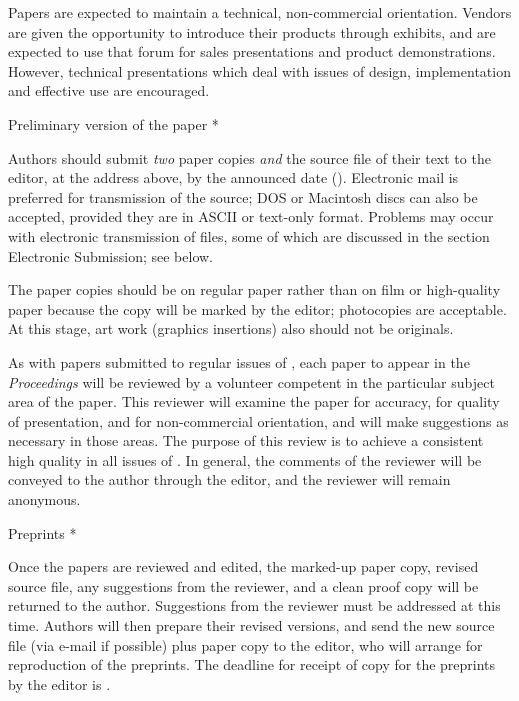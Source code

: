 Papers are expected to maintain a technical, non-commercial orientation.
Vendors are given the opportunity to introduce their products through
exhibits, and are expected to use that forum for sales presentations and
product demonstrations.  However, technical presentations which deal
with issues of design, implementation and effective use are encouraged.
 
\figure[\bot]
\endfigure
 
\subhead * Preliminary version of the paper *
 
Authors should submit {\it two\/} paper copies {\it and\/} the source
file of their text to the editor, at the address above, by the announced
date ({\bf \PrelimDeadline}). Electronic mail is preferred for
transmission of the source; {\SMC DOS} or Macintosh discs can also be
accepted, provided they are in {\SMC ASCII} or text-only format.
Problems may occur with electronic transmission of files, some of which
are discussed in the section Electronic Submission; see below.
 
The paper copies should be on regular paper rather than on
film or high-quality paper because the copy will be marked by the
editor; photocopies are acceptable.  At this stage, art work (graphics
insertions) also should not be originals.
 
As with papers submitted to regular issues of \TUB, each paper to appear
in the {\sl Proceedings\/} will be reviewed by a volunteer competent in
the particular subject area of the paper.  This reviewer will examine
the paper for accuracy, for quality of presentation, and for
non-commercial orientation, and will make suggestions as necessary in
those areas.  The purpose of this review is to achieve a consistent high
quality in all issues of \TUB.  In general, the comments of the reviewer
will be conveyed to the author through the editor, and the reviewer will
remain anonymous.
 
\subhead * Preprints *
 
Once the papers are reviewed and edited, the marked-up paper copy,
revised source file, any suggestions from the reviewer, and a clean
proof copy will be returned to the author.  Suggestions from the
reviewer must be addressed at this time.  Authors will then prepare
their revised versions, and send the new source file (via e-mail if
possible) plus paper copy to the editor, who will arrange for
reproduction of the preprints.  The deadline for receipt of copy for the
preprints by the editor is {\bf \PreprintDeadline}.
 
